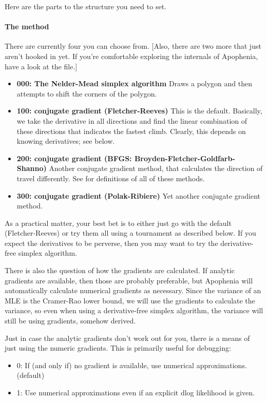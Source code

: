 Here are the parts to the  
structure you need to set. 

\paragraph{The method} There are currently four you can choose from.
[Also, there are two more that  just aren't hooked in yet. If you're
comfortable exploring the internals of Apophenia, have a look at the
 file.]


\begin{itemize}
\item {\bf 000: The Nelder-Mead simplex algorithm} Draws a polygon and then attempts to shift the corners of the polygon.
\item {\bf 100: conjugate gradient (Fletcher-Reeves)} This is the
default. Basically, we take the derivative in all directions and find
the linear combination of these directions that indicates the fastest
climb. Clearly, this depends on knowing derivatives; see below.
\item {\bf 200: conjugate gradient (BFGS: Broyden-Fletcher-Goldfarb-Shanno)}  Another conjugate gradient method, that calculates the direction of travel differently. See \cite{avriel:nonlinear} for definitions of all of these methods.
\item {\bf 300: conjugate gradient (Polak-Ribiere)} Yet another conjugate gradient method.
\end{itemize}

As a practical matter, your best bet is to either just go with the default (Fletcher-Reeves) or try them all using a tournament as described below. 
If you expect the derivatives to be perverse, then you may want to try the derivative-free simplex algorithm.

There is also the question of how the gradients are calculated. If
analytic gradients are available, then those are probably preferable, but
Apophenia will automatically calculate numerical gradients as necessary.
Since the variance of an MLE is the Cramer-Rao lower bound, we will use
the gradients to calculate the variance, so even when using a
derivative-free simplex algorithm, the variance will still be using
gradients, somehow derived.

Just in case the analytic gradients don't work out for you, there is a
means of just using the numeric gradients. This is primarily useful for debugging:

\begin{itemize}
\item 0: If (and only if) no gradient is available, use numerical approximations.  (default)
\item 1: Use numerical approximations even if an explicit dlog likelihood is given. 
\end{itemize}

